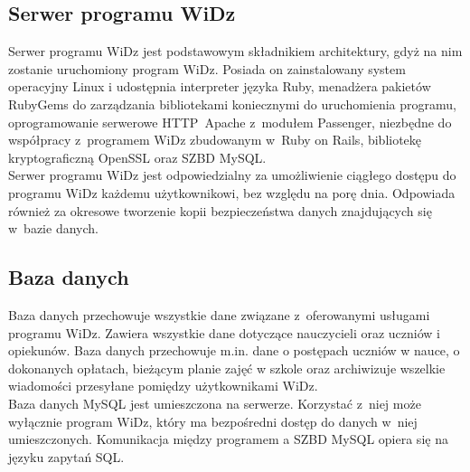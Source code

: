 \documentclass[12pt,leqno,twoside]{mwart}
\begin{document}
\subsection{Serwer programu WiDz}
\noindent Serwer programu WiDz jest podstawowym składnikiem architektury, gdyż na nim zostanie uruchomiony program WiDz. Posiada on zainstalowany system operacyjny Linux i udostępnia interpreter języka Ruby, menadżera pakietów RubyGems do zarządzania bibliotekami koniecznymi do uruchomienia programu, oprogramowanie serwerowe \hbox{HTTP Apache} z~modułem Passenger, niezbędne do współpracy z~programem WiDz zbudowanym w~Ruby on Rails, bibliotekę kryptograficzną OpenSSL oraz SZBD MySQL.\\
\indent Serwer programu WiDz jest odpowiedzialny za umożliwienie ciągłego dostępu do programu WiDz każdemu użytkownikowi, bez względu na porę dnia. Odpowiada również za okresowe tworzenie kopii bezpieczeństwa danych znajdujących się w~bazie danych. 

\subsection{Baza danych}
\noindent Baza danych przechowuje wszystkie dane związane z~oferowanymi usługami programu WiDz. Zawiera wszystkie dane dotyczące nauczycieli oraz uczniów i opiekunów. Baza danych przechowuje m.in. dane o postępach uczniów w nauce, o dokonanych opłatach, bieżącym planie zajęć w szkole oraz archiwizuje wszelkie wiadomości przesyłane pomiędzy użytkownikami WiDz.\\
\indent Baza danych  MySQL jest umieszczona na serwerze. Korzystać z~niej może wyłącznie program WiDz, który ma bezpośredni dostęp do danych w~niej umieszczonych. Komunikacja między programem a SZBD MySQL opiera się na języku zapytań SQL.
\end{document}
